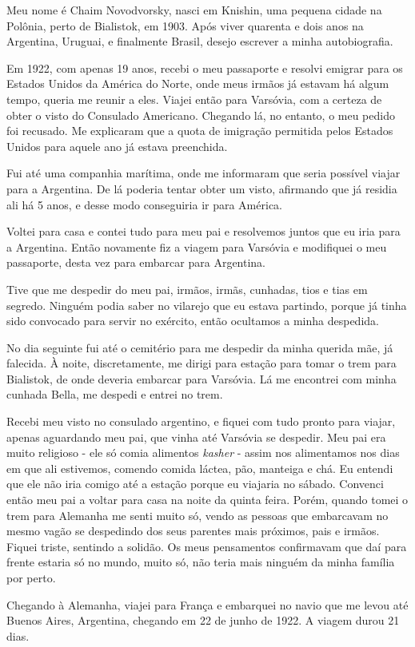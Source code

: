 Meu nome é Chaim Novodvorsky, nasci em Knishin, uma pequena cidade na
Polônia, perto de Bialistok, em 1903. Após viver quarenta e dois anos na
Argentina, Uruguai, e finalmente Brasil, desejo escrever a minha
autobiografia.

Em 1922, com apenas 19 anos, recebi o meu passaporte e resolvi emigrar
para os Estados Unidos da América do Norte, onde meus irmãos já estavam
há algum tempo, queria me reunir a eles. Viajei então para Varsóvia, com
a certeza de obter o visto do Consulado Americano. Chegando lá, no
entanto, o meu pedido foi recusado. Me explicaram que a quota de
imigração permitida pelos Estados Unidos para aquele ano já estava
preenchida.

Fui até uma companhia marítima, onde me informaram que seria possível
viajar para a Argentina. De lá poderia tentar obter um visto, afirmando
que já residia ali há 5 anos, e desse modo conseguiria ir para América.

Voltei para casa e contei tudo para meu pai e resolvemos juntos que eu
iria para a Argentina. Então novamente fiz a viagem para Varsóvia e
modifiquei o meu passaporte, desta vez para embarcar para Argentina.

Tive que me despedir do meu pai, irmãos, irmãs, cunhadas, tios e tias em
segredo. Ninguém podia saber no vilarejo que eu estava partindo, porque
já tinha sido convocado para servir no exército, então ocultamos a minha
despedida.

No dia seguinte fui até o cemitério para me despedir da minha querida
mãe, já falecida. À noite, discretamente, me dirigi para estação para
tomar o trem para Bialistok, de onde deveria embarcar para Varsóvia. Lá
me encontrei com minha cunhada Bella, me despedi e entrei no trem.

Recebi meu visto no consulado argentino, e fiquei com tudo pronto para
viajar, apenas aguardando meu pai, que vinha até Varsóvia se despedir.
Meu pai era muito religioso - ele só comia alimentos \textit{kasher} - assim nos
alimentamos nos dias em que ali estivemos, comendo comida láctea, pão,
manteiga e chá. Eu entendi que ele não iria comigo até a estação porque
eu viajaria no sábado. Convenci então meu pai a voltar para casa na
noite da quinta feira. Porém, quando tomei o trem para Alemanha me senti
muito só, vendo as pessoas que embarcavam no mesmo vagão se despedindo
dos seus parentes mais próximos, pais e irmãos. Fiquei triste, sentindo
a solidão. Os meus pensamentos confirmavam que daí para frente estaria
só no mundo, muito só, não teria mais ninguém da minha família por
perto.

Chegando à Alemanha, viajei para França e embarquei no navio que me
levou até Buenos Aires, Argentina, chegando em 22 de junho de 1922. A
viagem durou 21 dias.